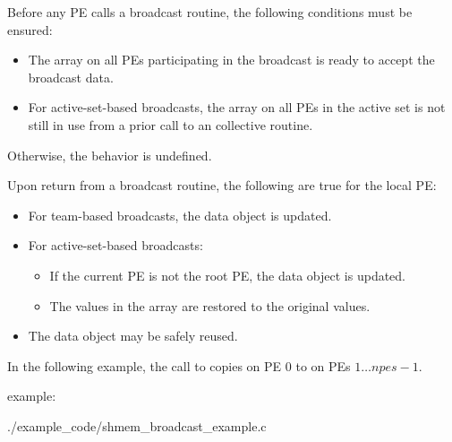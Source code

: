 \begin{apidefinition}
{    Before any \ac{PE} calls a broadcast routine, the following
    conditions must be ensured:
    \begin{itemize}
    \item The \dest{} array on all \acp{PE} participating in the broadcast
      is ready to accept the broadcast data.
    \item For active-set-based broadcasts, the
       array on all \acp{PE} in the
      active set is not still in use from a prior call to an \openshmem
      collective routine.
    \end{itemize}
    Otherwise, the behavior is undefined.

    Upon return from a broadcast routine, the following are true for the local
    \ac{PE}:
    \begin{itemize}
    \item For team-based broadcasts, the \dest{} data object is
      updated.
    \item For active-set-based broadcasts:
      \begin{itemize}
      \item If the current \ac{PE} is not the root \ac{PE}, the
        \dest{} data object is updated.
      \item The values in the  array are restored to the
        original values.
      \end{itemize}
    \item The \source{} data object may be safely reused.
    \end{itemize}
}




\begin{apiexamples}

\apicexample
    {In the following \Cstd[11] example, the call to  copies \source{}
    on \ac{PE} $0$ to \dest{} on \acp{PE} $1\dots npes-1$.

    \CorCpp{} example:}
    {./example_code/shmem_broadcast_example.c}
    {}

\end{apiexamples}

\end{apidefinition}
